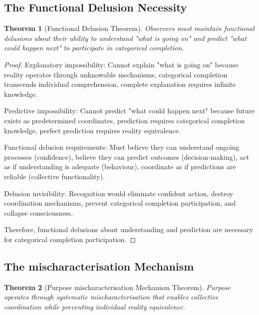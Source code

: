 \documentclass[12pt,a4paper]{article}
\newtheorem{theorem}{Theorem}[section]
\begin{document}
\subsection{The Functional Delusion Necessity}

\begin{theorem}[Functional Delusion Theorem]
Observers must maintain functional delusions about their ability to understand "what is going on" and predict "what could happen next" to participate in categorical completion.
\end{theorem}

\begin{proof}
Explanatory impossibility: Cannot explain "what is going on" because reality operates through unknowable mechanisms, categorical completion transcends individual comprehension, complete explanation requires infinite knowledge.

Predictive impossibility: Cannot predict "what could happen next" because future exists as predetermined coordinates, prediction requires categorical completion knowledge, perfect prediction requires reality equivalence.

Functional delusion requirements: Must believe they can understand ongoing processes (confidence), believe they can predict outcomes (decision-making), act as if understanding is adequate (behaviour), coordinate as if predictions are reliable (collective functionality).

Delusion invisibility: Recognition would eliminate confident action, destroy coordination mechanisms, prevent categorical completion participation, and collapse consciousness.

Therefore, functional delusions about understanding and prediction are necessary for categorical completion participation.
\end{proof}

\subsection{The mischaracterisation Mechanism}

\begin{theorem}[Purpose mischaracterisation Mechanism Theorem]
Purpose operates through systematic mischaracterisation that enables collective coordination while preventing individual reality equivalence.
\end{theorem}
\end{document}
